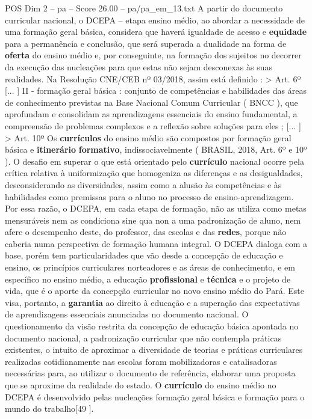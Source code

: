 \begin{textsample}{POS Dim 2 – pa – Score 26.00 – pa/pa\_em\_13.txt}
A partir do documento curricular nacional, o DCEPA – etapa ensino médio, ao abordar a necessidade de uma formação geral básica, considera que haverá igualdade de acesso e \textbf{equidade} para a permanência e conclusão, que será superada a dualidade na forma de \textbf{oferta} do ensino médio e, por conseguinte, na formação dos sujeitos no decorrer da execução das nucleações para que estas não sejam desconexas às suas realidades.
Na Resolução CNE/CEB nº 03/2018, assim está definido : > Art. 6º [... ] II - formação geral básica : conjunto de competências e habilidades das áreas de conhecimento previstas na Base Nacional Comum Curricular ( BNCC ), que aprofundam e consolidam as aprendizagens essenciais do ensino fundamental, a compreensão de problemas complexos e a reflexão sobre soluções para eles ; [... ] > Art. 10º Os \textbf{currículos} do ensino médio são compostos por formação geral básica e \textbf{itinerário} \textbf{formativo}, indissociavelmente ( BRASIL, 2018, Art. 6º e 10º ).
O desafio em superar o que está orientado pelo \textbf{currículo} nacional ocorre pela crítica relativa à uniformização que homogeniza as diferenças e as desigualdades, desconsiderando as diversidades, assim como a alusão às competências e às habilidades como premissas para o aluno no processo de ensino-aprendizagem.
Por essa razão, o DCEPA, em cada etapa de formação, não as utiliza como metas mensuráveis nem as condiciona sine qua non a uma padronização de aluno, nem afere o desempenho deste, do professor, das escolas e das \textbf{redes}, porque não caberia numa perspectiva de formação humana integral.
O DCEPA dialoga com a base, porém tem particularidades que vão desde a concepção de educação e ensino, os princípios curriculares norteadores e as áreas de conhecimento, e em específico no ensino médio, a educação \textbf{profissional} e \textbf{técnica} e o projeto de vida, que é o aporte da concepção curricular no novo ensino médio do Pará.
Este visa, portanto, a \textbf{garantia} ao direito à educação e a superação das expectativas de aprendizagens essenciais anunciadas no documento nacional.
O questionamento da visão restrita da concepção de educação básica apontada no documento nacional, a padronização curricular que não contempla práticas existentes, o intuito de aproximar a diversidade de teorias e práticas curriculares realizadas cotidianamente nas escolas foram mobilizadoras e catalisadoras necessárias para, ao utilizar o documento de referência, elaborar uma proposta que se aproxime da realidade do estado.
O \textbf{currículo} do ensino médio no DCEPA é desenvolvido pelas nucleações formação geral básica e formação para o mundo do trabalho[49 ].

\end{textsample}
